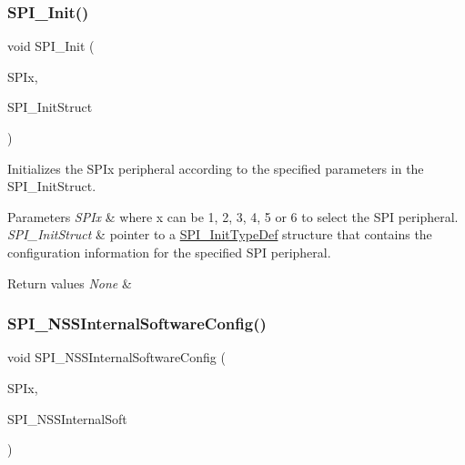 \subsubsection{\texorpdfstring{S\+P\+I\+\_\+\+Init()}{SPI\_Init()}}
{\footnotesize\ttfamily void S\+P\+I\+\_\+\+Init (\begin{DoxyParamCaption}\item[{S\+P\+I\+\_\+\+Type\+Def $\ast$}]{S\+P\+Ix,  }\item[{\mbox{\hyperlink{struct_s_p_i___init_type_def}{S\+P\+I\+\_\+\+Init\+Type\+Def}} $\ast$}]{S\+P\+I\+\_\+\+Init\+Struct }\end{DoxyParamCaption})}



Initializes the S\+P\+Ix peripheral according to the specified parameters in the S\+P\+I\+\_\+\+Init\+Struct. 


\begin{DoxyParams}{Parameters}
{\em S\+P\+Ix} & where x can be 1, 2, 3, 4, 5 or 6 to select the S\+PI peripheral. \\
\hline
{\em S\+P\+I\+\_\+\+Init\+Struct} & pointer to a \mbox{\hyperlink{struct_s_p_i___init_type_def}{S\+P\+I\+\_\+\+Init\+Type\+Def}} structure that contains the configuration information for the specified S\+PI peripheral. \\
\hline
\end{DoxyParams}

\begin{DoxyRetVals}{Return values}
{\em None} & \\
\hline
\end{DoxyRetVals}
\mbox{\label{group___s_p_i_ga56fc508a482f032f9eb80e4c63184126}} 
\subsubsection{\texorpdfstring{S\+P\+I\+\_\+\+N\+S\+S\+Internal\+Software\+Config()}{SPI\_NSSInternalSoftwareConfig()}}
{\footnotesize\ttfamily void S\+P\+I\+\_\+\+N\+S\+S\+Internal\+Software\+Config (\begin{DoxyParamCaption}\item[{S\+P\+I\+\_\+\+Type\+Def $\ast$}]{S\+P\+Ix,  }\item[{uint16\+\_\+t}]{S\+P\+I\+\_\+\+N\+S\+S\+Internal\+Soft }\end{DoxyParamCaption})}



